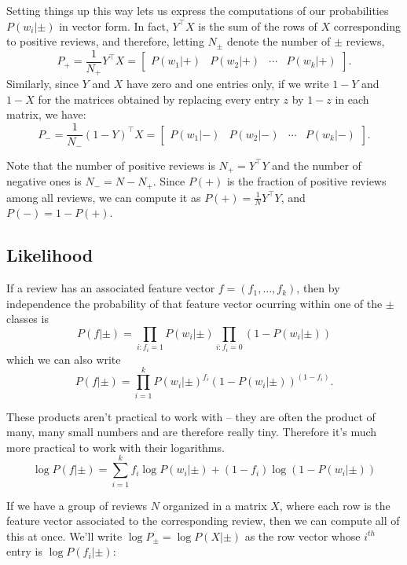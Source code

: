 \documentclass[
]{article}
\begin{document}
Setting things up this way lets us express the computations of our
probabilities \(P(w_{i}|\pm)\) in vector form. In fact,
\(Y^{\intercal}X\) is the sum of the rows of \(X\) corresponding to
positive reviews, and therefore, letting \(N_{\pm}\) denote the number
of \(\pm\) reviews, \[
P_{+} = \frac{1}{N_{+}}Y^{\intercal}X = \left[\begin{array}{cccc} P(w_{1}|+)& P(w_{2}|+) & \cdots &P(w_{k}|+)\end{array}\right].
\] Similarly, since \(Y\) and \(X\) have zero and one entries only, if
we write \(1-Y\) and \(1-X\) for the matrices obtained by replacing
every entry \(z\) by \(1-z\) in each matrix, we have: \[
P_{-} = \frac{1}{N_{-}}(1-Y)^{\intercal}X =  \left[\begin{array}{cccc} P(w_{1}|-)& P(w_{2}|-) & \cdots &P(w_{k}|-)\end{array}\right].
\]

Note that the number of positive reviews is \(N_{+}=Y^{\intercal}Y\) and
the number of negative ones is \(N_{-}=N-N_{+}\). Since \(P(+)\) is the
fraction of positive reviews among all reviews, we can compute it as
\(P(+)=\frac{1}{N}Y^{\intercal}Y\), and \(P(-)=1-P(+)\).

\hypertarget{likelihood}{%
\subsection{Likelihood}\label{likelihood}}

If a review has an associated feature vector \(f=(f_1,\ldots, f_k)\),
then by independence the probability of that feature vector ocurring
within one of the \(\pm\) classes is \[
P(f|\pm) = \prod_{i: f_{i}=1} P(w_{i}|\pm)\prod_{i: f_{i}=0}(1-P(w_{i}|\pm))
\] which we can also write \begin{equation}
P(f|\pm) = \prod_{i=1}^{k} P(w_{i}|\pm)^{f_{i}}(1-P(w_{i}|\pm))^{(1-f_{i})}.
\label{eq:likelihood}\end{equation}

These products aren't practical to work with -- they are often the
product of many, many small numbers and are therefore really tiny.
Therefore it's much more practical to work with their logarithms.
\begin{equation}
\log P(f|\pm) = \sum_{i=1}^{k} f_{i}\log P(w_{i}|\pm) + (1-f_{i})\log(1-P(w_{i}|\pm))
\label{eq:loglikelihood}\end{equation}

If we have a group of reviews \(N\) organized in a matrix \(X\), where
each row is the feature vector associated to the corresponding review,
then we can compute all of this at once. We'll write
\(\log P_{\pm}=\log P(X|\pm)\) as the row vector whose \(i^{th}\) entry
is \(\log P(f_{i}|\pm)\):
\end{document}
